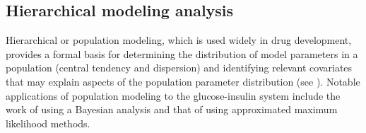 \documentclass[utf8]{frontiersSCNS} %
\begin{document}
\subsection{Hierarchical modeling analysis}
Hierarchical or population modeling, which is used widely in drug development, provides a formal basis for determining the distribution of model parameters in a population (central tendency and dispersion) and identifying relevant covariates that may explain aspects of the population parameter distribution (see \citet{Bonate2011}). Notable applications of population modeling to the glucose-insulin system include the work of \citet{agbaje_2003} using a Bayesian analysis and that of \citet{Denti2010} using approximated maximum likelihood methods.
\end{document}
